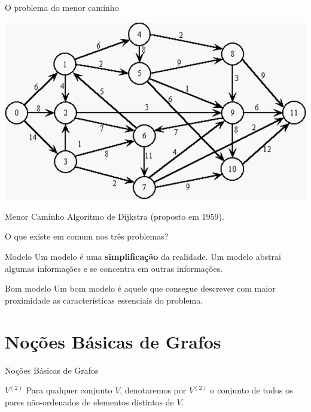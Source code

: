 \documentclass[xcolor=dvipsnames,table]{beamer}
\begin{document}
	\begin{frame}{O problema do menor caminho}
		\begin{center}
    		\includegraphics[height=.6\textheight]{images/redesGrafo.png}
  		\end{center}
		\begin{block}{Menor Caminho} \pause
			Algoritmo de Dijkstra (proposto em 1959).
		\end{block}
	\end{frame}
	
	\begin{frame}{O que existe em comum nos três problemas?} \pause
		\begin{block}{Modelo} \pause
			Um modelo é uma {\bf simplificação} da realidade. Um modelo abstrai algumas informações e se concentra em outras informações.
		\end{block} \pause
		\begin{block}{Bom modelo}
			Um bom modelo é aquele que consegue descrever com maior proximidade as características essenciais do problema.
		\end{block}
	\end{frame}
	
	\section{Noções Básicas de Grafos}	
	\begin{frame}{Noções Básicas de Grafos}
		\begin{block}{$V^{(2)}$}
			Para qualquer conjunto $V$, denotaremos por $V^{(2)}$ o conjunto de todos os pares não-ordenados de elementos distintos de $V$.
		\end{block}
	\end{frame}
	
\end{document}
